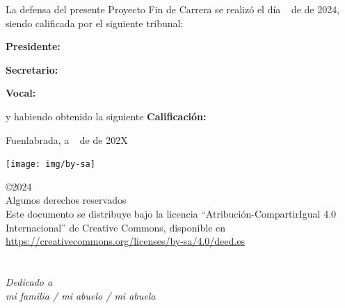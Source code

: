 \documentclass[a4paper, 12pt]{book}
\makeatletter
\let\theauthor\@author
\makeatother
\begin{document}
\vspace{0.8cm}
La defensa del presente Proyecto Fin de Carrera se realizó el día \qquad$\;\,$ de \qquad\qquad\qquad\qquad \newline de 2024, siendo calificada por el siguiente tribunal:


\vspace{0.5cm}
\textbf{Presidente:}

\vspace{1cm}
\textbf{Secretario:}

\vspace{1cm}
\textbf{Vocal:}


\vspace{1cm}
y habiendo obtenido la siguiente \textbf{Calificación:}


\vspace{1cm}
\begin{flushright}
  Fuenlabrada, a \qquad$\;\,$ de \qquad\qquad\qquad\qquad de 202X
\end{flushright}

\vspace{1cm}

\texttt{[image: img/by-sa]}

\noindent©2024 \theauthor  \\
Algunos derechos reservados  \\
Este documento se distribuye bajo la licencia ``Atribución-CompartirIgual 4.0 Internacional'' de Creative Commons, disponible en \\
\url{https://creativecommons.org/licenses/by-sa/4.0/deed.es}



\chapter*{}
\begin{flushright}
  \textit{Dedicado a \\
    mi familia / mi abuelo / mi abuela}
\end{flushright}

\end{document}
